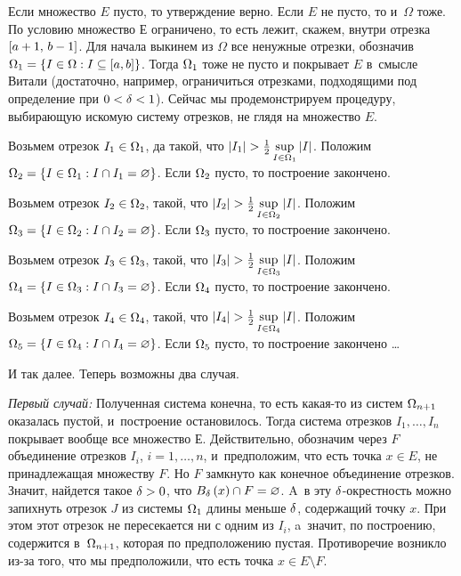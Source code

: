 \documentclass[draft]{article}
\begin{document}
\pr

Если множество $E$ пусто, то утверждение верно. Если $E$ не пусто,
то и~$\Omega$ тоже. По условию множество $Е$ ограничено, то есть
лежит, скажем, внутри отрезка $\seg[a+1,\,b-1]$. Для начала выкинем
из $\Omega$ все ненужные отрезки, обозначив
$\O1=\set{I\in\Omega:I\subseteq\segab}$. Тогда $\Omega_{1}$ тоже не пусто и
покрывает $E$ в~смысле Витали (достаточно, например, ограничиться
отрезками, подходящими под определение при $0 < \delta < 1$).
Сейчас мы продемонстрируем процедуру, выбирающую искомую систему
отрезков, не глядя на множество $E$.

\smallskip

Возьмем отрезок $I_1\in\Omega_{1}$, да такой, что
$\abs{I_1}>{1\over2} \sup\limits_{I\in\O1}  \abs{I}$. Положим
$\Omega_{2}=\left\{I\in\Omega_{1}:I\cap I_1=\varnothing\right\}$. Если $\Omega_{2}$ пусто, то
построение закончено.

\smallskip

Возьмем отрезок $I_2\in\Omega_{2}$, такой, что
$\abs{I_2}>{1\over2} \sup\limits_{I\in\O2}  \abs{I}$. Положим
$\Omega_{3}=\left\{I\in\Omega_{2}:I\cap I_2=\varnothing\right\}$. Если $\Omega_{3}$ пусто, то
построение закончено.

\smallskip

Возьмем отрезок $I_3\in\Omega_{3}$, такой, что
$\abs{I_3}>{1\over2} \sup\limits_{I\in\O3}  \abs{I}$. Положим
$\Omega_{4}=\left\{I\in\Omega_{3}:I\cap I_3=\varnothing\right\}$. Если $\Omega_{4}$ пусто, то
построение закончено.

\smallskip

Возьмем отрезок $I_4\in\Omega_{4}$, такой, что
$\abs{I_4}>{1\over2} \sup\limits_{I\in\O4}  \abs{I}$. Положим
$\Omega_{5}=\left\{I\in\Omega_{4}:I\cap I_4=\varnothing\right\}$. Если $\Omega_{5}$ пусто, то
построение закончено \dots

\smallskip

И так далее. Теперь возможны два случая.

\eject

{\sl Первый случай:} Полученная система конечна, то есть какая-то из
систем $\Omega_{n+1}$ оказалась пустой, и~построение остановилось. Тогда
система отрезков $I_1,\dots,I_n$ покрывает вообще все множество $Е$.
Действительно, обозначим через $F$ объединение отрезков $I_i$,
$i = 1,\dots,n$, и~предположим, что есть точка $x\in E$, не
принадлежащая множеству $F$. Но $F$ замкнуто как конечное
объединение отрезков. Значит, найдется такое $\delta > 0$, что
$B_{\de}\atx\cap F=\varnothing$. A~в эту $\delta$-окрестность можно
запихнуть отрезок $J$ из системы $\Omega_{1}$ длины меньше $\delta$,
содержащий точку $x$. При этом этот отрезок не пересекается ни с
одним из $I_i$, a~значит, по построению, содержится в~$\Omega_{n+1}$,
которая по предположению пустая. Противоречие возникло из-за того,
что мы предположили, что есть точка $x\in E\setminus F$.
\end{document}
